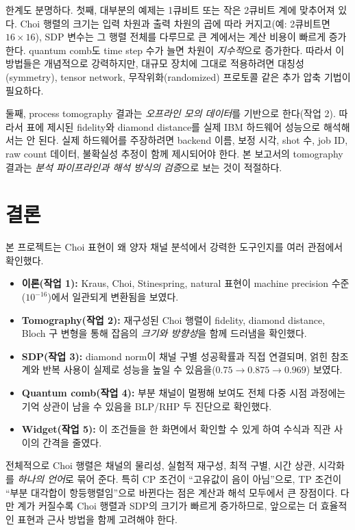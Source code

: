 \documentclass[11pt,a4paper]{article}
\begin{document}
한계도 분명하다. 첫째, 대부분의 예제는 1큐비트 또는 작은 2큐비트 계에 맞추어져 있다. Choi 행렬의 크기는 입력 차원과 출력 차원의 곱에 따라 커지고(예: 2큐비트면 $16\times16$), SDP 변수는 그 행렬 전체를 다루므로 큰 계에서는 계산 비용이 빠르게 증가한다. quantum comb도 time step 수가 늘면 차원이 \emph{지수적}으로 증가한다. 따라서 이 방법들은 개념적으로 강력하지만, 대규모 장치에 그대로 적용하려면 대칭성(symmetry), tensor network, 무작위화(randomized) 프로토콜 같은 추가 압축 기법이 필요하다.

둘째, process tomography 결과는 \emph{오프라인 모의 데이터}를 기반으로 한다(작업 2). 따라서 표에 제시된 fidelity와 diamond distance를 실제 IBM 하드웨어 성능으로 해석해서는 안 된다. 실제 하드웨어를 주장하려면 backend 이름, 보정 시각, shot 수, job ID, raw count 데이터, 불확실성 추정이 함께 제시되어야 한다. 본 보고서의 tomography 결과는 \emph{분석 파이프라인과 해석 방식의 검증}으로 보는 것이 적절하다.

\section{결론}

본 프로젝트는 Choi 표현이 왜 양자 채널 분석에서 강력한 도구인지를 여러 관점에서 확인했다.

\begin{itemize}
  \item \textbf{이론(작업 1):} Kraus, Choi, Stinespring, natural 표현이 machine precision 수준($10^{-16}$)에서 일관되게 변환됨을 보였다.
  \item \textbf{Tomography(작업 2):} 재구성된 Choi 행렬이 fidelity, diamond distance, Bloch 구 변형을 통해 잡음의 \emph{크기와 방향성}을 함께 드러냄을 확인했다.
  \item \textbf{SDP(작업 3):} diamond norm이 채널 구별 성공확률과 직접 연결되며, 얽힌 참조계와 반복 사용이 실제로 성능을 높일 수 있음을($0.75\to0.875\to0.969$) 보였다.
  \item \textbf{Quantum comb(작업 4):} 부분 채널이 멀쩡해 보여도 전체 다중 시점 과정에는 기억 상관이 남을 수 있음을 BLP/RHP 두 진단으로 확인했다.
  \item \textbf{Widget(작업 5):} 이 조건들을 한 화면에서 확인할 수 있게 하여 수식과 직관 사이의 간격을 줄였다.
\end{itemize}

전체적으로 Choi 행렬은 채널의 물리성, 실험적 재구성, 최적 구별, 시간 상관, 시각화를 \emph{하나의 언어}로 묶어 준다. 특히 CP 조건이 ``고유값이 음이 아님''으로, TP 조건이 ``부분 대각합이 항등행렬임''으로 바뀐다는 점은 계산과 해석 모두에서 큰 장점이다. 다만 계가 커질수록 Choi 행렬과 SDP의 크기가 빠르게 증가하므로, 앞으로는 더 효율적인 표현과 근사 방법을 함께 고려해야 한다.
\end{document}
